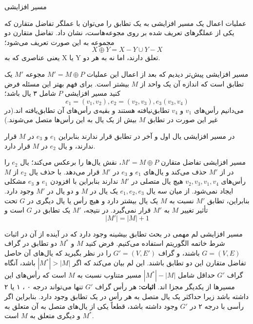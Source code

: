 \begin{itemframe}{مسیر افزایشی}

\itm
عملیات اعمال یک مسیر افزایشی به یک تطابق را می‌توان با عملگر تفاضل متقارن
 که یکی از عملگرهای تعریف شده بر روی مجوعه‌هاست، نشان داد.
\itm
تفاضل متقارن دو مجموعه به این صورت تعریف می‌شود؛
$$ X \oplus Y = X - Y \cup Y - X$$
یعنی عناصری که به X یا Y تعلق دارند، اما نه به هر دو.
\end{itemframe}

\begin{itemframe}{مسیر افزایشی}
\itm
پیش‌تر دیدیم که بعد از اعمال این عملیات
$M' = M \oplus P$
مجوعه $M' $ یک تطابق است که اندازه آن یک واحد از $M$ بیشتر است.
\itm
برای فهم بهتر این مسئله  فرض کنید مسیر افزایشی $P$ شامل ۳ یال باشد؛
$$ e_1=(v_1, v_2), e_2=(v_2, v_3), e_3(v_3, v_4)$$
می‌دانیم رأس‌های
$v_1$ و
$v_4$
تطابق‌نیافته هستند و بقیه‌ی رأس‌های آن تطابق‌یافته ‌اند.(در غیر این ‌صورت در تطابق $M$ بیش از یک یال به این رأس‌ها
متصل می‌شوند.)

\itm
در مسیر افزایشی یال اول و آخر در تطابق قرار ندارند بنابراین
$e_1$ و
$e_3$
در $M$ قرار ندارند، و یال
$e_2$
در $M$ قرار دارد.
\end{itemframe}

\begin{itemframe}{مسیر افزایشی}
\itm
تفاضل متقارن $M' = M \oplus P$، نقش یال‌ها را برعکس می‌کند؛ یال
$e_2$
را در از $M'$ حذف می‌کند و یال‌های
$e_1$ و
$e_3$
در $M'$ قرار می‌دهد.
\itm
با حذف یال
$e_2$
از $M$ رأس‌های
$v_2, v_3, v_1, v_4$
هیچ یال متصلی در $M'$  ندارند بنابراین با افزودن
$e_1$ و
$e_3$
مشکلی ایجاد نمی‌شود.
\itm
از میان سه یال
$e_1, e_2, e_3$
یک یال در $M$ و دو یال در $M'$ وجود دارد. بنابراین، تطابق $M'$ نسبت به $M$ یک یال بیشتر دارد و هیچ رأس یا یال دیگری در $G$ تحت تأثیر تغییر $M$ به $M'$ قرار نمی‌گیرد.
\itm
در نتیجه، $M'$ یک تطابق در $G$ است و
$$|M'| = |M| + 1$$

\end{itemframe}

\begin{itemframe}{مسیر افزایشی}
\itm
لم مهمی در بحث تطابق بیشینه وجود دارد که در آینده از آن در اثبات شرط خاتمه الگوریتم استفاده می‌کنیم.
\itm
فرض کنید
$M$ و
$M^*$
دو تطابق در گراف
$G = (V, E)$
 باشند، و گراف
$G' = (V, E')$
را در نظر بگیرید که یال‌های آن حاصل تفاضل متقارن این دو تطابق باشند. این لم بیان می‌کند که  اگر
$|M^*| > |M|$
باشد، آنگاه گراف $G'$ حداقل شامل $|M^*| - |M|$ مسیر متناوب نسبت به $M$ است که رأس‌های این مسیرها از یکدیگر مجزا اند.
\itm
\textbf{اثبات:}
هر رأس گراف $G'$ تنها می‌تواند درجه ۰ ، ۱ یا ۲ داشته باشد زیرا حداکثر یک یال متصل به هر رأس در یک تطابق وجود دارد. بنابراین اگر رأسی با درجه ۲ در  $G'$ وجود داشته باشد، قطعاً یکی از یال‌های متصل به آن متعلق به $M^*$ و دیگری متعلق به $M$ است.

\end{itemframe}

